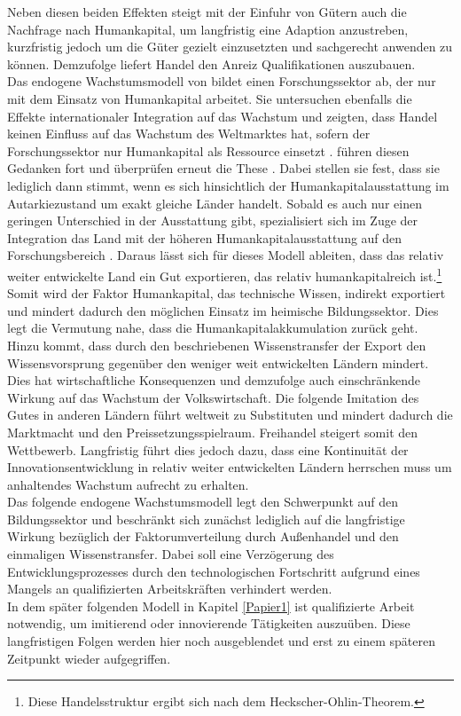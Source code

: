 Neben diesen beiden Effekten steigt mit der Einfuhr von Gütern auch die Nachfrage nach Humankapital, um langfristig eine Adaption anzustreben, kurzfristig jedoch um die Güter gezielt einzusetzten und sachgerecht anwenden zu können. Demzufolge liefert Handel den Anreiz Qualifikationen auszubauen. \\
Das endogene Wachstumsmodell von \citet{RiveraBatiz.1991a} bildet einen Forschungssektor ab, der nur mit dem Einsatz von Humankapital arbeitet. Sie untersuchen ebenfalls die Effekte internationaler Integration auf das Wachstum und zeigten, dass Handel keinen Einfluss auf das Wachstum des Weltmarktes hat, sofern der Forschungssektor nur Humankapital als Ressource einsetzt \citep{RiveraBatiz.1991a}. \citet{Devereux.1994} f{\"u}hren diesen Gedanken fort und {\"u}berpr{\"u}fen erneut die These \citep{RiveraBatiz.1991a}. Dabei stellen sie fest, dass sie lediglich dann stimmt, wenn es sich hinsichtlich der Humankapitalausstattung im Autarkiezustand um exakt gleiche L{\"a}nder handelt. Sobald es auch nur einen geringen Unterschied in der Ausstattung gibt, spezialisiert sich im Zuge der Integration das Land mit der h{\"o}heren Humankapitalausstattung auf den Forschungsbereich \citep{Devereux.1994}. Daraus lässt sich für dieses Modell ableiten, dass das relativ weiter entwickelte Land ein Gut exportieren, das relativ humankapitalreich ist.\footnote{Diese Handelsstruktur ergibt sich nach dem Heckscher-Ohlin-Theorem.} Somit wird der Faktor Humankapital, das technische Wissen, indirekt exportiert und mindert dadurch den möglichen Einsatz im heimische Bildungssektor. Dies legt die Vermutung nahe, dass die Humankapitalakkumulation zurück geht. Hinzu kommt, dass durch den beschriebenen Wissenstransfer der Export den Wissensvorsprung gegenüber den weniger weit entwickelten Ländern mindert. Dies hat wirtschaftliche Konsequenzen und demzufolge auch einschränkende Wirkung auf das Wachstum der Volkswirtschaft. Die folgende Imitation des Gutes in anderen Ländern führt weltweit zu Substituten und mindert dadurch die Marktmacht und den Preissetzungsspielraum. Freihandel steigert somit den Wettbewerb. Langfristig führt dies jedoch dazu, dass eine Kontinuität der Innovationsentwicklung in relativ weiter entwickelten Ländern herrschen muss um anhaltendes Wachstum aufrecht zu erhalten. \\
Das folgende endogene Wachstumsmodell legt den Schwerpunkt auf den Bildungssektor und  beschränkt sich zunächst lediglich auf die langfristige Wirkung bezüglich der Faktorumverteilung durch Au{\ss}enhandel und den einmaligen Wissenstransfer. Dabei soll eine Verzögerung des Entwicklungsprozesses durch den technologischen Fortschritt aufgrund eines Mangels an qualifizierten Arbeitskräften verhindert werden.\\
In dem später folgenden Modell in Kapitel \ref{Papier1} ist qualifizierte Arbeit notwendig, um imitierend oder innovierende Tätigkeiten auszuüben. Diese langfristigen Folgen werden hier noch ausgeblendet und erst zu einem späteren Zeitpunkt wieder aufgegriffen. \\


